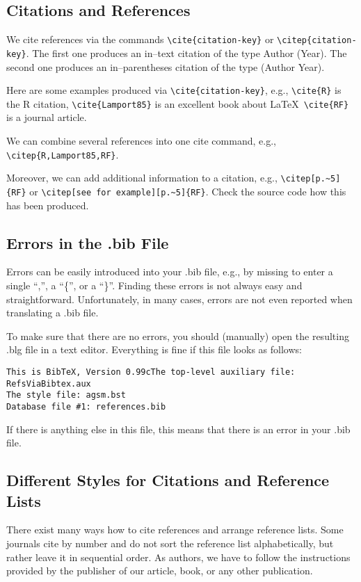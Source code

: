 \documentclass[12pt]{article}
\begin{document}
\subsection{Citations and References}

We cite references via the commands \verb|\cite{citation-key}|
or \verb|\citep{citation-key}|. The first one produces
an in--text citation of the type Author (Year). The second one
produces an in--parentheses citation of the type (Author Year).

Here are some examples produced via \verb|\cite{citation-key}|,
e.g., \verb|\cite{R}| is the R citation,
\verb|\cite{Lamport85}| is an excellent book about \LaTeX\, \verb|\cite{RF}| is
a journal article.

We can combine several references into one cite command, e.g.,
\verb|\citep{R,Lamport85,RF}|.

Moreover, we can add additional information to a citation, e.g.,
\verb|\citep[p.~5]{RF}| or \verb|\citep[see for example][p.~5]{RF}|.
Check the source code how this has been produced.

\subsection{Errors in the .bib File}

Errors can be easily introduced into your .bib file, e.g., by missing to
enter a single ``,'', a ``\{'', or a ``\}''. Finding these errors is not
always easy and straightforward. Unfortunately, in many cases,
errors are not even reported when translating a .bib file.

To make sure that there are no errors, you should (manually)
open the resulting .blg file in a text editor. Everything
is fine if this file looks as follows:
\begin{verbatim}
This is BibTeX, Version 0.99cThe top-level auxiliary file: RefsViaBibtex.aux
The style file: agsm.bst
Database file #1: references.bib
\end{verbatim}

If there is anything else in this file, this means that there is an 
error in your .bib file.

\subsection{Different Styles for Citations and Reference Lists}

There exist many ways how to cite references and arrange reference lists.
Some journals cite by number and do not sort the reference list 
alphabetically, but rather leave it in sequential order. As authors,
we have to follow the instructions provided by the publisher
of our article, book, or any other publication.
\end{document}
